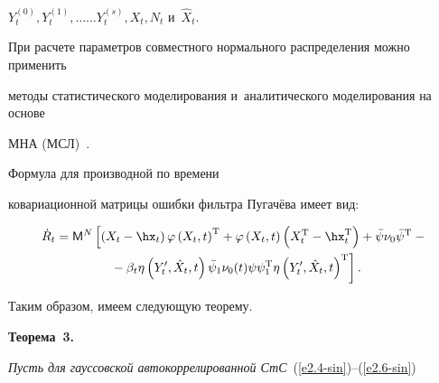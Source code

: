 $Y_t^{(0)}, Y_t^{(1)}, \ldots$\linebreak $\ldots Y_t^{(s)}, X_t, N_t$ и~$\hat X_t$.





При расчете параметров совместного нормального распределения можно применить 


методы статистического моделирования и~аналитического моделирования на основе 


МНА (МСЛ)~\cite{2-sin}.





Формула для производной по времени


ковариационной матрицы ошибки фильтра Пугачёва имеет вид:





\pagebreak








\noindent


\begin{multline*}


\dot R_t = {\sf M}^N \left[ \left(X_{t} -\hx_t\right)\varphi 


\left(X_{t},t\right)^{\mathrm{T}} +\varphi\left( X_{t},t\right)


\left(X_{t}^{\mathrm{T}}-\hx_t^{\mathrm{T}}\right)+ 


\bar\psi\nu_0\bar\psi^{\mathrm{T}}-{}\right.\\


\left.{}- \beta_t\eta \left(Y_t',\hat X_t,t\right)\bar\psi_1 \nu_0(t)\psi\psi_1^{\mathrm{T}}


     \eta \left(Y_t',\hat X_t,t\right)^{\mathrm{T}}\right].




     \end{multline*}





Таким образом, имеем следующую теорему.





\smallskip





\noindent


\textbf{Теорема~3.}\


\textit{Пусть для гауссовской автокоррелированной СтС}~(\ref{e2.4-sin})--(\ref{e2.6-sin}) 


